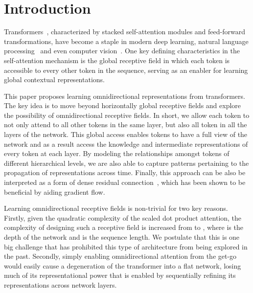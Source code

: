 \documentclass{article}
\begin{document}
\section{Introduction}
 Transformers~\citep{vaswani2017attention}, characterized by stacked self-attention modules and feed-forward transformations, have become a staple in modern deep learning, natural language processing~\citep{devlin2018bert,raffel2019exploring} and even computer vision~\citep{dosovitskiy2020image}. 
 One key defining characteristics in the self-attention mechanism is the global receptive field in which each token is accessible to every other token in the sequence, serving as an enabler for learning global contextual representations.
 
 This paper proposes learning omnidirectional representations from transformers. The key idea is to move beyond horizontally global receptive fields and explore the possibility of omnidirectional receptive fields. In short, we allow each token to not only attend to all other tokens in the same layer, but also all token in all the layers of the network. This global access enables tokens to have a full view of the network and as a result access the knowledge and intermediate representations of every token at each layer. 
 By modeling the relationships amongst tokens of different hierarchical levels, we are also able to capture patterns pertaining to the propagation of representations across time. Finally, this approach can be also be interpreted as a form of dense residual connection~\citep{huang2017densely}, which has been shown to be beneficial by aiding gradient flow.

 
Learning omnidirectional receptive fields is non-trivial for two key reasons. 
Firstly, given the quadratic complexity of the scaled dot product attention, the complexity of designing such a receptive field is increased from  to , where  is the depth of the network and  is the sequence length. We postulate that this is one big challenge that has prohibited this type of architecture from being explored in the past. 
Secondly, simply enabling omnidirectional attention from the get-go would easily cause a degeneration of the transformer into a flat network, losing much of its representational power that is enabled by sequentially refining its representations across network layers.
\end{document}
